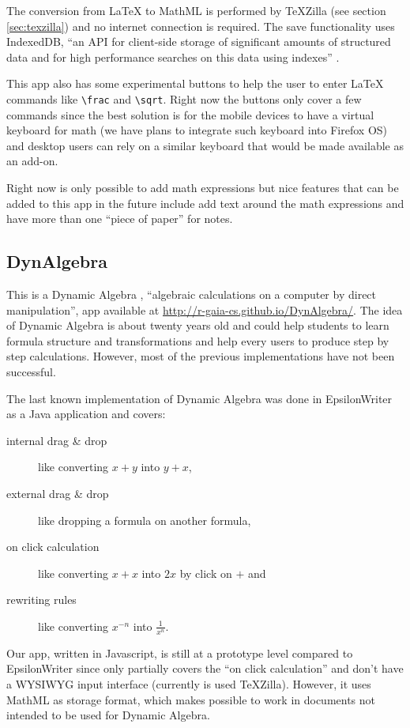 The conversion from LaTeX to MathML is performed by TeXZilla
(see section \ref{sec:texzilla})
and no internet connection is required. The save functionality
uses IndexedDB, ``an API for client-side storage of significant amounts of
structured data and for high performance searches on this data using indexes''
 \cite{IndexedDatabaseAPI}.

This app also has some experimental buttons to help the user to enter LaTeX commands like
{\tt \textbackslash frac} and {\tt \textbackslash sqrt}. Right now the buttons
only cover a few commands since the best solution is for the mobile devices
to have a virtual keyboard for math (we have plans to integrate
such keyboard into Firefox OS) and desktop users can rely on a similar keyboard
that would be made available as an add-on.

Right now is only possible to add math expressions but nice features that can be
added to this app in the future include add text around the math expressions and
have more than one ``piece of paper'' for notes.

\subsection{DynAlgebra}

This is a Dynamic Algebra \cite{Nicaud1}, ``algebraic calculations
on a computer by direct manipulation'', app available at
\href{http://r-gaia-cs.github.io/DynAlgebra/}{http://r-gaia-cs.github.io/DynAlgebra/}.
The idea of Dynamic Algebra is about twenty years old and could help
students to learn formula structure and transformations and help every users to
produce step by step calculations. However, most of the previous implementations
have not been successful.

The last known implementation of Dynamic Algebra was done in EpsilonWriter
\cite{Nicaud2} as a Java application and covers:
\begin{description}
  \item[internal drag \& drop] like converting $x + y$ into $y + x$,
  \item[external drag \& drop] like dropping a formula on another formula,
  \item[on click calculation] like converting $x + x$ into $2 x$ by click on $+$ and
  \item[rewriting rules] like converting $x^{-n}$ into $\frac{1}{x^n}$.
\end{description}

Our app, written in Javascript, is still at a prototype level compared
to EpsilonWriter since only partially
covers the ``on click calculation'' and don't have a WYSIWYG input interface
(currently is used TeXZilla). However, it uses MathML as storage format,
which makes possible to work in documents not intended to be used for
Dynamic Algebra.
